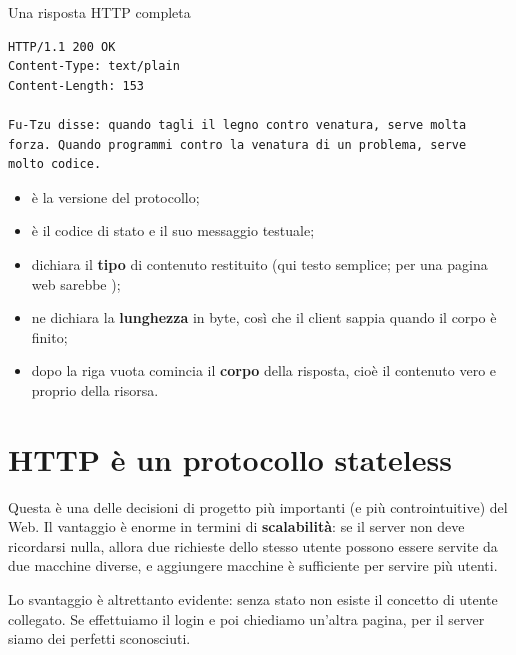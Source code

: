 \begin{esempio}{Una risposta HTTP completa}
\begin{lstlisting}[style=http, name=Risposta HTTP]
HTTP/1.1 200 OK
Content-Type: text/plain
Content-Length: 153

Fu-Tzu disse: quando tagli il legno contro venatura, serve molta
forza. Quando programmi contro la venatura di un problema, serve
molto codice.
\end{lstlisting}

\begin{itemize}
  \item {} è la versione del protocollo;
  \item {} è il codice di stato e  il suo messaggio testuale;
  \item {} dichiara il \textbf{tipo} di contenuto restituito
        (qui testo semplice; per una pagina web sarebbe );
  \item {} ne dichiara la \textbf{lunghezza} in byte, così che
        il client sappia quando il corpo è finito;
  \item dopo la riga vuota comincia il \textbf{corpo} della risposta, cioè il
        contenuto vero e proprio della risorsa.
\end{itemize}
\end{esempio}

\section{HTTP è un protocollo stateless}


Questa è una delle decisioni di progetto più importanti (e più controintuitive)
del Web. Il vantaggio è enorme in termini di \textbf{scalabilità}: se il server
non deve ricordarsi nulla, allora due richieste dello stesso utente possono
essere servite da due macchine diverse, e aggiungere macchine è sufficiente per
servire più utenti.

Lo svantaggio è altrettanto evidente: senza stato non esiste il concetto di
\guillemotleft utente collegato\guillemotright. Se effettuiamo il login e poi chiediamo un'altra
pagina, per il server siamo dei perfetti sconosciuti.

